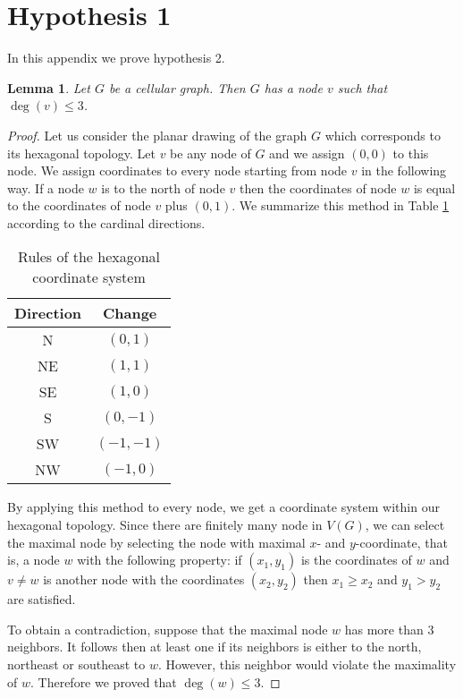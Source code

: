 \documentclass[letterpaper, 10 pt, conference]{ieeeconf}  %
\newtheorem{lem}{Lemma}
\begin{document}
\appendices

\section{Hypothesis 1}
In this appendix we prove hypothesis 2.

\begin{lem}\label{lem:degree-constraint}
Let $G$ be a cellular graph. Then $G$ has a node $v$ such that $\deg(v) \leqslant 3$.
\end{lem}

\begin{proof} Let us consider the planar drawing of the graph $G$ which corresponds to its hexagonal topology.
Let $v$ be any node of $G$ and we assign $(0,0)$ to this node. We assign coordinates to every node starting from node $v$ in the following way. If a node $w$ is to the north of node $v$ then the coordinates of node $w$ is equal to the coordinates of node $v$ plus $(0,1)$. We summarize this method in Table \ref{table:assignment} according to the cardinal directions.
\begin{table}[!h]
\centering
 \begin{tabular}{||c|c||} 
 \hline
 Direction & Change  \\ [0.5ex] 
 \hline\hline
 N & $(0,1)$  \\ 
 \hline
 NE & $(1,1)$ \\
 \hline
 SE & $(1,0)$ \\
 \hline
 S & $(0,-1)$ \\
 \hline
 SW & $(-1,-1)$ \\
 \hline
 NW & $(-1,0)$ \\
 \hline
 \end{tabular}
  \caption{Rules of the hexagonal coordinate system}\label{table:assignment}
\end{table}
By applying this method to every node, we get a coordinate system within our hexagonal topology. Since there are finitely many node in $V(G)$, we can select the maximal node by selecting the node with maximal $x$- and $y$-coordinate, that is, a node $w$ with the following property: if $(x_1,y_1)$ is the coordinates of $w$ and $v \neq w$ is another node with the coordinates $(x_2,y_2)$ then $x_1 \geqslant x_2$ and $y_1 > y_2$ are satisfied.

To obtain a contradiction, suppose that the maximal node $w$ has more than 3 neighbors. It follows then at least one if its neighbors is either to the north, northeast or southeast to $w$. However, this neighbor would violate the maximality of $w$. Therefore we proved that $\deg(w) \leqslant 3$.
\end{proof}
\end{document}
